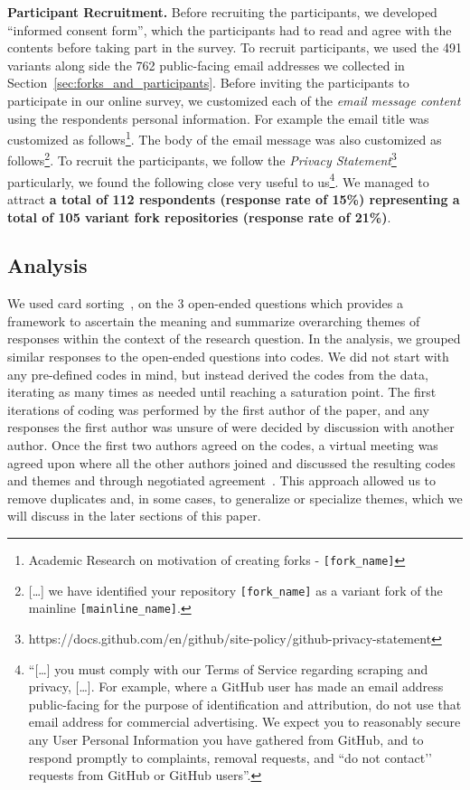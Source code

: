 \nd \textbf{Participant Recruitment.} Before recruiting the participants, we developed ``informed consent form'', which the participants had to read and agree with the contents before taking part in the survey. 
To recruit participants, we used the 491 variants along side the 762 public-facing email addresses we collected in Section~\ref{sec:forks_and_participants}. Before inviting the participants to participate in our online survey, we customized each of the \textit{email message content} using the respondents personal information. For example the email title was customized as follows\footnote{Academic Research on motivation of creating forks - \texttt{[fork\_name]}}. The body of the email message was also customized as follows\footnote{[\ldots] we have identified your \gh repository \texttt{[fork\_name]} as a variant fork of the mainline \texttt{[mainline\_name]}.}.
To recruit the participants, we follow the \textit{\gh Privacy Statement}\footnote{https://docs.github.com/en/github/site-policy/github-privacy-statement} particularly, we found the following close very useful to us\footnote{``[\ldots] you must comply with our Terms of Service regarding scraping and privacy, [\ldots]. For example, where a GitHub user has made an email address public-facing for the purpose of identification and attribution, do not use that email address for commercial advertising. We expect you to reasonably secure any User Personal Information you have gathered from GitHub, and to respond promptly to complaints, removal requests, and ``do not contact’’ requests from GitHub or GitHub users''.}. We managed to attract \textbf{a total of 112 respondents (response rate of 15\%) representing a total of 105 variant fork repositories (response rate of 21\%)}.



\subsection{Analysis}
\label{sec:card_sorting}
We used card sorting~\cite{zimmermann2016card}, on the 3 open-ended questions which provides a framework to ascertain the meaning and summarize overarching themes of responses within the context of the research question. In the analysis, we grouped similar responses to the open-ended questions into codes. We did not start with any pre-defined codes in mind, but instead derived the codes from the data, iterating as many times as needed until reaching a saturation point. The first iterations of coding was performed by the first author of the paper, and any responses the first author was unsure of were decided by discussion with another author. Once the first two authors agreed on the codes, a virtual meeting was agreed upon where all the other authors joined and discussed the resulting codes and themes and through negotiated agreement~\cite{Garrison:2006}. This approach allowed us to remove duplicates and, in some cases, to generalize or specialize themes, which we will discuss in the later sections of this paper.



